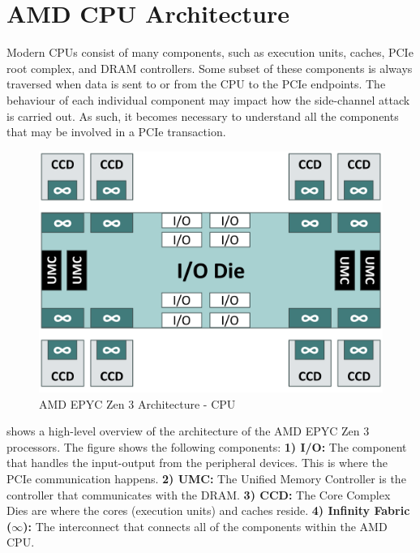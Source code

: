 \section{AMD CPU Architecture}
\label{subsec:amd-arch-bg}

Modern CPUs consist of many components, such as execution units, caches, PCIe root complex, and DRAM controllers.
Some subset of these components is always traversed when data is sent to or from the CPU to the PCIe endpoints.
The behaviour of each individual component may impact how the side-channel attack is carried out.
As such, it becomes necessary to understand all the components that may be involved in a PCIe transaction.

\begin{figure}[!htb]
    \centering
    \includegraphics[width=\columnwidth]{figures/background/amd_arch/processor.png}
    \caption{AMD EPYC Zen 3 Architecture - CPU}
    \label{fig:amd-cpu}
\end{figure}


 shows a high-level overview of the architecture of the AMD EPYC Zen 3 processors.
The figure shows the following components:
\textbf{1) I/O:} The component that handles the input-output from the peripheral devices. This is where the PCIe communication happens.
\textbf{2) UMC:} The Unified Memory Controller is the controller that communicates with the DRAM.
\textbf{3) CCD:} The Core Complex Dies are where the cores (execution units) and caches reside.
\textbf{4) Infinity Fabric ($\infty$):} The interconnect that connects all of the components within the AMD CPU.

